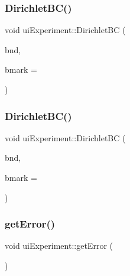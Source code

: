 \mbox{\label{classui_experiment_a03675f636c0949ae93bed21719f9a820}} 
\subsubsection{\texorpdfstring{Dirichlet\+B\+C()}{DirichletBC()}\hspace{0.1cm}{\footnotesize\ttfamily [1/2]}}
{\footnotesize\ttfamily void ui\+Experiment\+::\+Dirichlet\+BC (\begin{DoxyParamCaption}\item[{\mbox{\hyperlink{complex__node___t_h_f_e_m_2emdefs_8h_af8816f473dfdd972d676674921eb65f3}{C\+Func}}}]{bnd,  }\item[{int}]{bmark = {} }\end{DoxyParamCaption})}

\mbox{\label{classui_experiment_a03675f636c0949ae93bed21719f9a820}} 
\subsubsection{\texorpdfstring{Dirichlet\+B\+C()}{DirichletBC()}\hspace{0.1cm}{\footnotesize\ttfamily [2/2]}}
{\footnotesize\ttfamily void ui\+Experiment\+::\+Dirichlet\+BC (\begin{DoxyParamCaption}\item[{\mbox{\hyperlink{complex__node___t_h_f_e_m_2emdefs_8h_af8816f473dfdd972d676674921eb65f3}{C\+Func}}}]{bnd,  }\item[{int}]{bmark = {} }\end{DoxyParamCaption})}

\mbox{\label{classui_experiment_a4a8beb61cd0e3061d9be1273c371cadf}} 
\subsubsection{\texorpdfstring{get\+Error()}{getError()}\hspace{0.1cm}{\footnotesize\ttfamily [1/2]}}
{\footnotesize\ttfamily void ui\+Experiment\+::get\+Error (\begin{DoxyParamCaption}{ }\end{DoxyParamCaption})}

